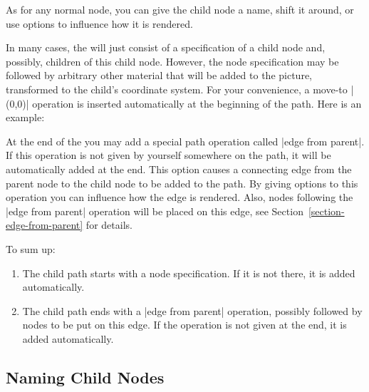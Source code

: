 As for any normal node, you can give the child node a name, shift it 
around, or use options to influence how it is rendered.
\begin{codeexample}[]
\end{codeexample}

In many cases, the  will just consist of a
specification of a child node and, possibly, children of this child
node. However, the node specification may be followed by arbitrary
other material that will be added to the picture, transformed to the
child's coordinate system. For your convenience, a move-to |(0,0)|
operation is inserted automatically at the beginning of the path. Here
is an example: 

\begin{codeexample}[]
\end{codeexample}


At the end of the  you may add a special path
operation called |edge from parent|. If this operation is not given by
yourself somewhere on the path, it will be automatically added at the
end. This option causes a connecting edge from the parent node to the
child node to be added to the path. By giving options to this
operation you can influence how the edge is rendered. Also, nodes
following the |edge from parent| operation will be placed on this
edge, see Section~\ref{section-edge-from-parent} for details.

To sum up:
\begin{enumerate}
\item
  The child path starts with a node specification. If it is not there,
  it is added automatically.
\item
  The child path ends with a |edge from parent| operation, possibly
  followed by nodes to be put on this edge. If the operation is not
  given at the end, it is added automatically.
\end{enumerate}



\subsection{Naming Child Nodes}

